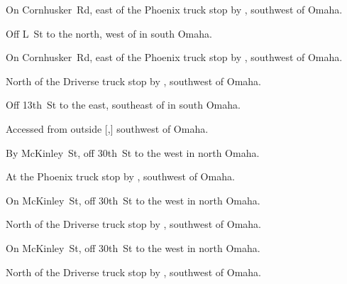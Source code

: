 
\begin{LocationList}

On Cornhusker~Rd, east of the Phoenix truck stop by  , southwest of Omaha.

Off  L~St to the north, west of  in south Omaha.

On Cornhusker~Rd, east of the Phoenix truck stop by  , southwest of Omaha.

\Location{\GarageHQ \Garage}
North of the Driverse truck stop by  , southwest of Omaha.

Off 13th~St to the east, southeast of  in south Omaha.

Accessed from  outside [,] southwest of Omaha.

By  McKinley~St, off  30th~St to the west in north Omaha.

At the Phoenix truck stop by  , southwest of Omaha.

On  McKinley~St, off  30th~St to the west in north Omaha.

North of the Driverse truck stop by  , southwest of Omaha.

On  McKinley~St, off  30th~St to the west in north Omaha.

North of the Driverse truck stop by  , southwest of Omaha.

\end{LocationList}
